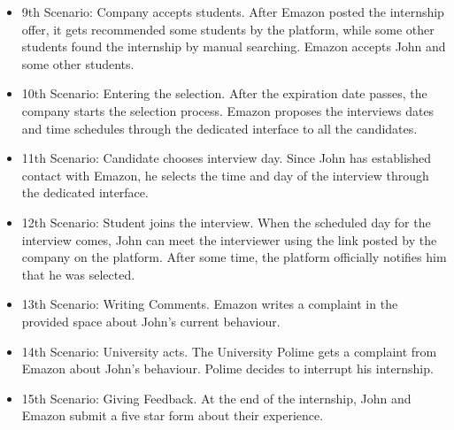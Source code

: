 \documentclass[a4paper,12pt]{article}
\begin{document}
\begin{itemize}
        \item 9th Scenario: Company accepts students. After Emazon posted the internship offer, it gets recommended some students by the platform, while some other students found the internship by manual searching. Emazon accepts John and some other students.
        \item 10th Scenario: Entering the selection. After the expiration date passes, the company starts the selection process. Emazon proposes the interviews dates and time schedules through the dedicated interface to all the candidates.
        \item 11th Scenario: Candidate chooses interview day. Since John has established contact with Emazon, he selects the time and day of the interview through the dedicated interface.
        \item 12th Scenario: Student joins the interview. When the scheduled day for the interview comes, John can meet the interviewer using the link posted by the company on the platform. After some time, the platform officially notifies him that he was selected.
        \item 13th Scenario: Writing Comments. Emazon writes a complaint in the provided space about John's current behaviour.
        \item 14th Scenario: University acts. The University Polime gets a complaint from Emazon about John's behaviour. Polime decides to interrupt his internship.
        \item 15th Scenario: Giving Feedback. At the end of the internship, John and Emazon submit a five star form about their experience.
    \end{itemize}
\end{document}
